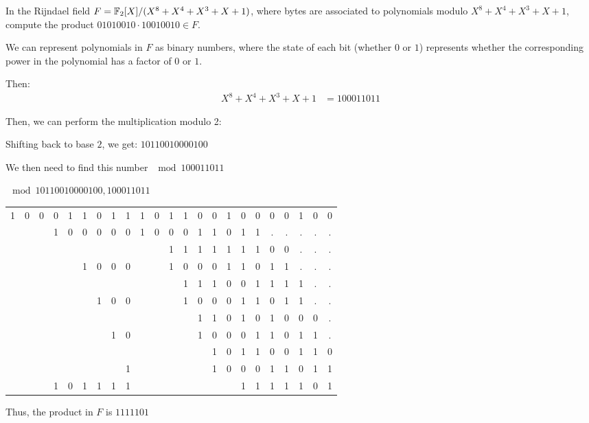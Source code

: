 
\begin{problem}
  In the Rijndael field $F=\mathbb{F}_2[X]/(X^8+X^4+X^3+X+1)$,
  where bytes are associated to polynomials modulo $X^8+X^4+X^3+X+1$,
  compute the product $01010010 \cdot 10010010 \in F$.
  \end{problem}
  
  \begin{Answer}
  
  We can represent polynomials in $F$ as binary numbers,
  where the state of each bit (whether $0$ or $1$) represents whether the
  corresponding power in the polynomial has a factor of $0$ or $1$.
  
  \noindent
  Then:
  \begin{align*}
    X^8+X^4+X^3+X+1 &= 100011011
  \end{align*}
  
  \noindent
  Then, we can perform the multiplication modulo 2:
  \bigskip
  \center{}
  
  \flushleft{}
  Shifting back to base $2$, we get:
  $1 0 1 1 0 0 1 0 0 0 0 1 0 0$
  
  \noindent
  We then need to find this number $\mod 100011011$
  
  \center{}
  $\mod{1 0 1 1 0 0 1 0 0 0 0 1 0 0},{1 0 0 0 1 1 0 1 1}$
  
  \begin{tabular}{c@{\,}c@{\,}c@{\,}c@{\,}c@{\,}c@{\,}c@{\,}c@{\,}c@{\,}|c@{\,}c@{\,}c@{\,}c@{\,}c@{\,}c@{\,}c@{\,}c@{\,}c@{\,}c@{\,}c@{\,}c@{\,}c@{\,}c@{\,}}
    1 & 0 & 0 & 0 & 1 & 1 & 0 & 1 & 1    & 1 & 0 & 1 & 1 & 0 & 0 & 1 & 0 & 0 & 0 & 0 & 1 & 0 & 0\\
      &   &   & 1 & 0 & 0 & 0 & 0 & 0    & 1 & 0 & 0 & 0 & 1 & 1 & 0 & 1 & 1 &.  &.  &.  &.  &. \\
      &   &   &   &   &   &   &   &      &   &   & 1 & 1 & 1 & 1 & 1 & 1 & 1 & 0 & 0 &.  &.  &. \\
      &   &   &   &   & 1 & 0 & 0 & 0    &   &   & 1 & 0 & 0 & 0 & 1 & 1 & 0 & 1 & 1 &.  &.  &. \\
      &   &   &   &   &   &   &   &      &   &   &   & 1 & 1 & 1 & 0 & 0 & 1 & 1 & 1 & 1 &.  &. \\
      &   &   &   &   &   & 1 & 0 & 0    &   &   &   & 1 & 0 & 0 & 0 & 1 & 1 & 0 & 1 & 1 &.  &. \\
      &   &   &   &   &   &   &   &      &   &   &   &   & 1 & 1 & 0 & 1 & 0 & 1 & 0 & 0 & 0 &. \\
      &   &   &   &   &   &   & 1 & 0    &   &   &   &   & 1 & 0 & 0 & 0 & 1 & 1 & 0 & 1 & 1 &. \\
      &   &   &   &   &   &   &   &      &   &   &   &   &   & 1 & 0 & 1 & 1 & 0 & 0 & 1 & 1 & 0\\
      &   &   &   &   &   &   &   & 1    &   &   &   &   &   & 1 & 0 & 0 & 0 & 1 & 1 & 0 & 1 & 1\\
  \hline{}
      &   &   & 1 & 0 & 1 & 1 & 1 & 1    &   &   &   &   &   &   &   & 1 & 1 & 1 & 1 & 1 & 0 & 1\\
  \end{tabular}
  
  \flushleft{}
  \noindent
  Thus, the product in $F$ is $1 1 1 1 1 0 1$
  \end{Answer}
